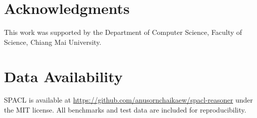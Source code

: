 \documentclass[preprint,12pt]{elsarticle}
\begin{document}
\section*{Acknowledgments}

This work was supported by the Department of Computer Science, Faculty of Science, Chiang Mai University.

\section*{Data Availability}

SPACL is available at \url{https://github.com/anusornchaikaew/spacl-reasoner} under the MIT license. All benchmarks and test data are included for reproducibility.



\end{document}

